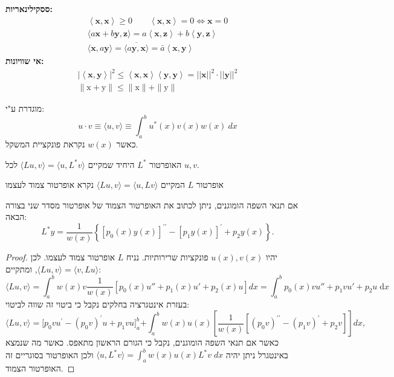 \documentclass{tstextbook}
\begin{document}
\begin{reminder}
\textbf{ססקילינאריות:}$$\begin{gather}\left\langle \mathbf{x},\mathbf{x} \right\rangle\geq0 \qquad \left\langle  \mathbf{x},\mathbf{x} \right\rangle=0\iff \mathbf{x}=0 \\ \langle a\mathbf{x}+b\mathbf{y},\mathbf{z}\rangle=a\left\langle\mathbf{x},\mathbf{z}\right\rangle+b\left\langle\mathbf{y},\mathbf{z}\right\rangle \\ \langle\mathbf{x},a\mathbf{y}\rangle=\overline{\langle a\mathbf{y},\mathbf{x}\rangle}=\bar{a}\left\langle\mathbf{x},\mathbf{y}\right\rangle
\end{gather}$$\textbf{אי שוויונות:}$$\begin{gather}\left|\left\langle \mathbf{x},\mathbf{y} \right\rangle\right|^2\leq\left\langle\mathbf{x},\mathbf{x}\right\rangle\left\langle\mathbf{y},\mathbf{y}\right\rangle=||\mathbf{x}||^2\cdot ||\mathbf{y}||^2\\ \|\mathrm{x}+\mathrm{y}\|\leq\|\mathrm{x}\|+\|\mathrm{y}\|
\end{gather}$$

\end{reminder}
\begin{definition}
מוגדרת ע"י:
$$ u\cdot v \equiv\langle u,v\rangle\equiv\int_a^bu^*(x)v(x)w(x)\:dx$$
כאשר \(w(x)\) נקראת פונקציית המשקל.

\end{definition}
\begin{definition}
האופרטור \(L^*\) היחיד שמקיים \(\langle Lu, v \rangle=\langle u, L^*v \rangle\) לכל \(u,v\).

\end{definition}
\begin{definition}
אופרטור \(L\) המקיים \(\langle Lu, v \rangle=\langle u, Lv \rangle\) נקרא אופרטור צמוד לעצמו

\end{definition}
\begin{proposition}
אם תנאי השפה הומוגנים, ניתן לכתוב את האופרטור הצמוד של אופרטור מסדר שני בצורה הבאה:
$$L^{*}y=\frac{1}{w(x)}\left\{\left[p_{0}(x)y(x)\right]^{\prime\prime}-\left[p_{1}y(x)\right]^{\prime}+p_{2}y(x)\right\}.$$

\end{proposition}
\begin{proof}
יהיו \(u(x),v(x)\) פונקציות שרירותיות. נניח \(L\) אופרטור צמוד לעצמו. לכן \(\langle Lu, v \rangle=\langle v, Lu \rangle\), ומתקיים:
$$\langle Lu, v \rangle \!=\!\int_{a}^b \!\!w(x)v\frac{1}{w(x)}\left[ p_0(x)u''\!+\!p_1(x)u'+p_2(x)u \right]dx\!=\!\int_{a}^b \!\!p_{0}(x)vu''+p_{1}vu'+p_{2}u\;\mathrm{d}x$$
בעזרת אינטגרציה בחלקים נקבל כי ביטוי זה שווה לביטוי:
$${{\displaystyle\langle Lu,v\rangle}}{{=}}{{\biggl[p_{0}v u^{\prime}-(p_{0}v)^{\prime}u+p_{1}v u\biggr]_{a}^{b}}}{{+\displaystyle\int_{a}^{b}w(x)u(x)\left[\frac{1}{w(x)}\left[(p_{0}v)^{\prime\prime}-(p_{1}v)^{\prime}+p_{2}v\right]\right]d x,}}$$
כאשר אם תנאי השפה הומוגנים, נקבל כי הגורם הראשון מתאפס. כאשר מה שנמצא באינטגרל ניתן יהיה \(\langle u, L^*v \rangle=\int_{a}^b w(x)u(x)L^*v\;dx\) ולכן האופרטור בסוגריים זה האופרטור הצמוד.

\end{proof}
\end{document}
